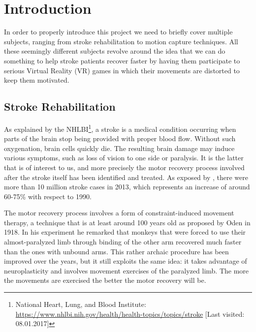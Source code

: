 
\chapter{Introduction} %

\label{Chapter1} %


In order to properly introduce this project we need to briefly cover multiple subjects, ranging from stroke rehabilitation to motion capture techniques. All these seemingly different subjects revolve around the idea that we can do something to help stroke patients recover faster by having them participate to serious Virtual Reality (VR) games in which their movements are distorted to keep them motivated.

\section{Stroke Rehabilitation}
As explained by the NHLBI\footnote{National Heart, Lung, and Blood Institute: \url{https://www.nhlbi.nih.gov/health/health-topics/topics/stroke} [Last visited: 08.01.2017]}, a stroke is a medical condition occurring when parts of the brain stop being provided with proper blood flow. Without such oxygenation, brain cells quickly die. The resulting brain damage may induce various symptoms, such as loss of vision to one side or paralysis. It is the latter that is of interest to us, and more precisely the motor recovery process involved after the stroke itself has been identified and treated. As exposed by \cite{vos2015global}, there were more than 10 million stroke cases in 2013, which represents an increase of around 60-75\% with respect to 1990.

The motor recovery process involves a form of constraint-induced movement therapy, a technique that is at least around 100 years old as proposed by Oden \cite{oden1918systematic} in 1918. In his experiment he remarked that monkeys that were forced to use their almost-paralyzed limb through binding of the other arm recovered much faster than the ones with unbound arms. This rather archaic procedure has been improved over the years, but it still exploits the same idea: it takes advantage of neuroplasticity and involves movement exercises of the paralyzed limb. The more the movements are exercised the better the motor recovery will be.

